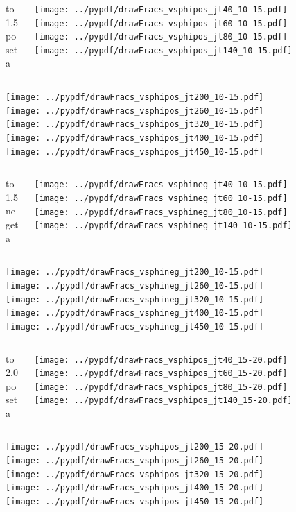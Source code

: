 \documentclass[aspectratio=169]{beamer}
\begin{document}
\begin{figure}[p]
\flushleft
\begin{columns}[T]
\begin{column}{.2\linewidth}
 to 1.5 poseta
\end{column}
\begin{column}{.8\linewidth}
\texttt{[image: ../pypdf/drawFracs\_vsphipos\_jt40\_10-15.pdf]}
\texttt{[image: ../pypdf/drawFracs\_vsphipos\_jt60\_10-15.pdf]}
\texttt{[image: ../pypdf/drawFracs\_vsphipos\_jt80\_10-15.pdf]}
\texttt{[image: ../pypdf/drawFracs\_vsphipos\_jt140\_10-15.pdf]}
\end{column}
\end{columns}
\texttt{[image: ../pypdf/drawFracs\_vsphipos\_jt200\_10-15.pdf]}
\texttt{[image: ../pypdf/drawFracs\_vsphipos\_jt260\_10-15.pdf]}
\texttt{[image: ../pypdf/drawFracs\_vsphipos\_jt320\_10-15.pdf]}
\texttt{[image: ../pypdf/drawFracs\_vsphipos\_jt400\_10-15.pdf]}
\texttt{[image: ../pypdf/drawFracs\_vsphipos\_jt450\_10-15.pdf]}
\end{figure}

\begin{figure}[p]
\flushleft
\begin{columns}[T]
\begin{column}{.2\linewidth}
 to 1.5 negeta
\end{column}
\begin{column}{.8\linewidth}
\texttt{[image: ../pypdf/drawFracs\_vsphineg\_jt40\_10-15.pdf]}
\texttt{[image: ../pypdf/drawFracs\_vsphineg\_jt60\_10-15.pdf]}
\texttt{[image: ../pypdf/drawFracs\_vsphineg\_jt80\_10-15.pdf]}
\texttt{[image: ../pypdf/drawFracs\_vsphineg\_jt140\_10-15.pdf]}
\end{column}
\end{columns}
\texttt{[image: ../pypdf/drawFracs\_vsphineg\_jt200\_10-15.pdf]}
\texttt{[image: ../pypdf/drawFracs\_vsphineg\_jt260\_10-15.pdf]}
\texttt{[image: ../pypdf/drawFracs\_vsphineg\_jt320\_10-15.pdf]}
\texttt{[image: ../pypdf/drawFracs\_vsphineg\_jt400\_10-15.pdf]}
\texttt{[image: ../pypdf/drawFracs\_vsphineg\_jt450\_10-15.pdf]}
\end{figure}

\begin{figure}[p]
\flushleft
\begin{columns}[T]
\begin{column}{.2\linewidth}
 to 2.0 poseta
\end{column}
\begin{column}{.8\linewidth}
\texttt{[image: ../pypdf/drawFracs\_vsphipos\_jt40\_15-20.pdf]}
\texttt{[image: ../pypdf/drawFracs\_vsphipos\_jt60\_15-20.pdf]}
\texttt{[image: ../pypdf/drawFracs\_vsphipos\_jt80\_15-20.pdf]}
\texttt{[image: ../pypdf/drawFracs\_vsphipos\_jt140\_15-20.pdf]}
\end{column}
\end{columns}
\texttt{[image: ../pypdf/drawFracs\_vsphipos\_jt200\_15-20.pdf]}
\texttt{[image: ../pypdf/drawFracs\_vsphipos\_jt260\_15-20.pdf]}
\texttt{[image: ../pypdf/drawFracs\_vsphipos\_jt320\_15-20.pdf]}
\texttt{[image: ../pypdf/drawFracs\_vsphipos\_jt400\_15-20.pdf]}
\texttt{[image: ../pypdf/drawFracs\_vsphipos\_jt450\_15-20.pdf]}
\end{figure}
\end{document}
